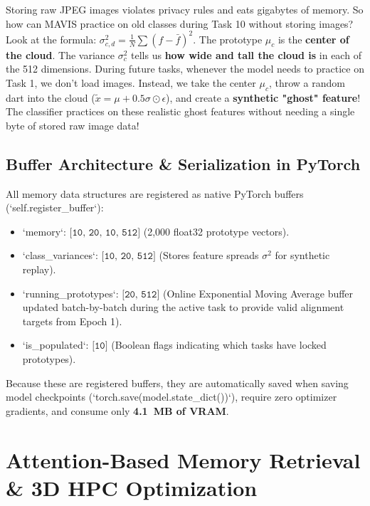 \documentclass[11pt,a4paper]{article}
\newcommand{\dimtensor}[1]{\texttt{[#1]}}
\begin{document}
\begin{callout}
Storing raw JPEG images violates privacy rules and eats gigabytes of memory. So how can MAVIS practice on old classes during Task 10 without storing images?\newline
Look at the formula: $\sigma_{c, d}^2 = \frac{1}{N} \sum (f - \bar{f})^2$.\newline
The prototype $\mu_c$ is the \textbf{center of the cloud}. The variance $\sigma_c^2$ tells us \textbf{how wide and tall the cloud is} in each of the 512 dimensions.
During future tasks, whenever the model needs to practice on Task 1, we don't load images. Instead, we take the center $\mu_c$, throw a random dart into the cloud ($\tilde{x} = \mu + 0.5 \sigma \odot \epsilon$), and create a \textbf{synthetic "ghost" feature}! The classifier practices on these realistic ghost features without needing a single byte of stored raw image data!
\end{callout}

\subsection{Buffer Architecture \& Serialization in PyTorch}
All memory data structures are registered as native PyTorch buffers (`self.register_buffer`):
\begin{itemize}[noitemsep]
    \item `memory`: $\dimtensor{10, 20, 10, 512}$ (2,000 float32 prototype vectors).
    \item `class_variances`: $\dimtensor{10, 20, 512}$ (Stores feature spreads $\sigma^2$ for synthetic replay).
    \item `running_prototypes`: $\dimtensor{20, 512}$ (Online Exponential Moving Average buffer updated batch-by-batch during the active task to provide valid alignment targets from Epoch 1).
    \item `is_populated`: $\dimtensor{10}$ (Boolean flags indicating which tasks have locked prototypes).
\end{itemize}
Because these are registered buffers, they are automatically saved when saving model checkpoints (`torch.save(model.state_dict())`), require zero optimizer gradients, and consume only \textbf{4.1~MB of VRAM}.

\newpage

\section{Attention-Based Memory Retrieval \& 3D HPC Optimization}
\label{sec:attention}
\end{document}

